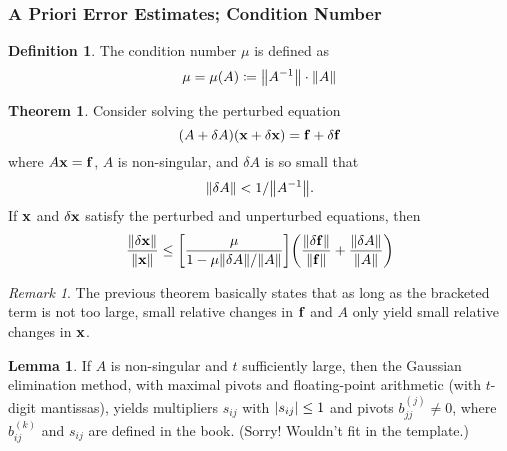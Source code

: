 \documentclass[11pt,letterpaper]{article}
\numberwithin{figure}{section} %
\newcommand{\inv}[1]{#1^{-1}}
\newcommand{\keyword}[1]{\colorbox{cyan!20!}{#1}}
\theoremstyle{definition}
\newtheorem{theorem}{Theorem}[subsection]
\theoremstyle{definition}
\newtheorem{lemma}{Lemma}[subsection]
\theoremstyle{definition}
\newtheorem{definition}{Definition}[subsection]
\theoremstyle{definition}
\theoremstyle{remark}
\newtheorem*{remark}{Remark}
\theoremstyle{remark}
\theoremstyle{definition}
\theoremstyle{remark}
\theoremstyle{remark}
\begin{document}
\begin{multicols*}{3}
\subsubsection{A Priori Error Estimates; Condition Number}
\begin{definition}
	The \keyword{condition number} $\mu$ is defined as
	\[
		\mu = \mu(A) \coloneqq \norm{\inv{A}} \cdot \norm{A}
	\]
\end{definition}
\begin{theorem}
	Consider solving the perturbed equation
	\[
		(A + \delta A)(\vb{x} + \vb{\delta x}) = \vb{f} + \vb{\delta f}
	\]
	where $A\vb{x} = \vb{f}$, $A$ is non-singular, and $\delta A$ is so small
	that
	\[
		\norm{\delta A} < 1 / \norm{\inv{A}}.
	\]
	If $\vb{x}$ and $\vb{\delta x}$ satisfy the perturbed and unperturbed
	equations, then 
	\[
		\frac{\norm{\vb{\delta \vb{x}}}}{\norm{\vb{x}}} \leq \bqty{\frac{\mu}{1 - \mu
		\norm{\delta A}/\norm{A}}} \pqty{\frac{\norm{\vb{\delta f}}}{\norm{\vb{f}}}
		+ \frac{\norm{\delta A}}{\norm{A}}}
	\]
\end{theorem}
\begin{remark}
	The previous theorem basically states that as long as the bracketed term is
	not too large, small relative changes in $\vb{f}$ and $A$ only yield small
	relative changes in $\vb{x}$.
\end{remark}
\begin{lemma}
	If $A$ is non-singular and $t$ sufficiently large, then the Gaussian
	elimination method, with maximal pivots and floating-point arithmetic (with
	$t$-digit mantissas), yields multipliers $s_{ij}$ with $\abs{s_{ij}} \leq 1$
	and pivots $b_{jj}^{(j)} \neq 0$, where $b_{ij}^{(k)}$ and $s_{ij}$ are
	defined in the book. (Sorry! Wouldn't fit in the template.)
\end{lemma}

\end{multicols*}
\end{document}
